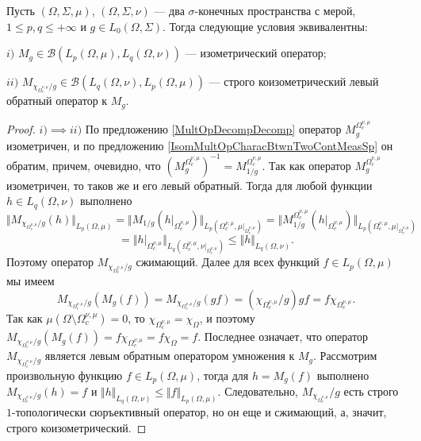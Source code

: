 \begin{proposition}\label{IsomMultOpDescBtwnTwoMeasSp} Пусть $(\Omega,\Sigma,\mu)$, $(\Omega,\Sigma,\nu)$ --- два $\sigma$-конечных пространства с мерой, $1\leq p,q\leq +\infty$ и $g\in L_0(\Omega,\Sigma)$. Тогда следующие условия эквивалентны:

$i)$ $M_g\in\mathcal{B}(L_p(\Omega,\mu),L_q(\Omega,\nu))$ --- изометрический оператор;

$ii)$ $M_{\chi_{\Omega_c^{\nu,\mu}}/g}\in\mathcal{B}(L_q(\Omega,\nu), L_p(\Omega,\mu))$ --- строго коизометрический левый обратный оператор к $M_g$.
\end{proposition}
\begin{proof} $i)$$\implies$$ ii)$ По предложению \ref{MultOpDecompDecomp} оператор $M_g^{\Omega_c^{\nu,\mu}}$ изометричен, и по предложению \ref{IsomMultOpCharacBtwnTwoContMeasSp} он обратим, причем, очевидно, что $(M_g^{\Omega_c^{\nu,\mu}})^{-1}=M_{1/g}^{\Omega_c^{\nu,\mu}}$. Так как оператор $M_g^{\Omega_c^{\nu,\mu}}$ изометричен, то таков же и его левый обратный. Тогда для любой функции $h\in L_q(\Omega,\nu)$ выполнено
$$
\Vert M_{\chi_{\Omega_c^{\nu,\mu}}/g}(h)\Vert_{L_p(\Omega,\mu)}=
\Vert M_{1/g}(h|_{\Omega_c^{\nu,\mu}})\Vert_{L_p(\Omega_c^{\nu,\mu},\mu|_{\Omega_c^{\nu,\mu}})}=
\Vert M_{1/g}^{\Omega_c^{\nu,\mu}}(h|_{\Omega_c^{\nu,\mu}})\Vert_{L_p(\Omega_c^{\nu,\mu},\mu|_{\Omega_c^{\nu,\mu}})}
$$
$$
=\Vert h|_{\Omega_c^{\nu,\mu}}\Vert_{L_q(\Omega_c^{\nu,\mu},\nu|_{\Omega_c^{\nu,\mu}})}
\leq \Vert h \Vert_{L_q(\Omega,\nu)}.
$$
Поэтому оператор $M_{\chi_{\Omega_c^{\nu,\mu}}/g}$ сжимающий. Далее для всех функций $f\in L_p(\Omega,\mu)$ мы имеем
$$
M_{\chi_{\Omega_c^{\nu,\mu}}/g}(M_g(f))
=M_{\chi_{\Omega_c^{\nu,\mu}}/g}(g  f)
=(\chi_{\Omega_c^{\nu,\mu}}/g)  g  f
=f \chi_{\Omega_c^{\nu,\mu}}.
$$
Так как $\mu(\Omega\setminus\Omega_c^{\nu,\mu})=0$, то $\chi_{\Omega_c^{\nu,\mu}}=\chi_{\Omega}$, и поэтому $M_{\chi_{\Omega_c^{\nu,\mu}}/g}(M_g(f))=f \chi_{\Omega_c^{\nu,\mu}}=f \chi_{\Omega}=f$. Последнее означает, что оператор $M_{\chi_{\Omega_c^{\nu,\mu}}/g}$ является левым обратным оператором умножения к $M_g$. Рассмотрим произвольную функцию $f\in L_p(\Omega,\mu)$, тогда для $h=M_g(f)$ выполнено $M_{\chi_{\Omega_c^{\nu,\mu}}/g}(h)=f$ и $\Vert h\Vert_{L_q(\Omega,\nu)}\leq\Vert f\Vert_{L_p(\Omega,\mu)}$. Следовательно, $M_{\chi_{\Omega_c^{\nu,\mu}}}/g$ есть строго $1$-топологически сюръективный оператор, но он еще и сжимающий, а, значит, строго коизометрический.


\end{proof}
